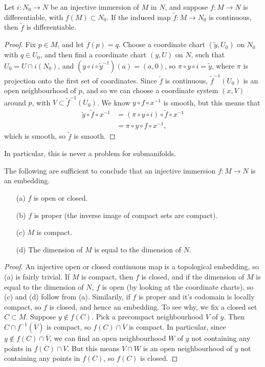 \begin{theorem}
    Let $i: N_0 \to N$ be an injective immersion of $M$ in $N$, and suppose $f: M \to N$ is differentiable, with $f(M) \subset N_0$. If the induced map $\tilde{f}: M \to N_0$ is continuous, then $\tilde{f}$ is differentiable.
\end{theorem}
\begin{proof}
    Fix $p \in M$, and let $f(p) = q$. Choose a coordinate chart $(\tilde{y},U_0)$ on $N_0$ with $q \in U_0$, and then find a coordinate chart $(y,U)$ on $N$, such that $U_0 = U \cap i(N_0)$, and $(y \circ i \circ \tilde{y}^{-1})(a) = (a,0)$, so $\pi \circ y \circ i = \tilde{y}$, where $\pi$ is projection onto the first set of coordinates. Since $\tilde{f}$ is continuous, $\tilde{f}^{-1}(U_0)$ is an open neighbourhood of $p$, and so we can choose a coordinate system $(x,V)$ around $p$, with $V \subset \tilde{f}^{-1}(U_0)$. We know $y \circ f \circ x^{-1}$ is smooth, but this means that
    \begin{align*}
        \tilde{y} \circ \tilde{f} \circ x^{-1} &= ( \pi \circ y \circ i) \circ \tilde{f} \circ x^{-1}\\
        &= \pi \circ y \circ f \circ x^{-1},
    \end{align*}
    which is smooth, so $\tilde{f}$ is smooth.
\end{proof}

In particular, this is never a problem for submanifolds.

\begin{theorem}
    The following are sufficient to conclude that an injective immersion $f: M \to N$ is an embedding.
    \begin{enumerate}
        \item[(a)] $f$ is open or closed.
        \item[(b)] $f$ is proper (the inverse image of compact sets are compact).
        \item[(c)] $M$ is compact.
        \item[(d)] The dimension of $M$ is equal to the dimension of $N$.
    \end{enumerate}
\end{theorem}
\begin{proof}
    An injective open or closed continuous map is a topological embedding, so (a) is fairly trivial. If $M$ is compact, then $f$ is closed, and if the dimension of $M$ is equal to the dimension of $N$, $f$ is open (by looking at the coordinate charts), so (c) and (d) follow from (a). Similarily, if $f$ is proper and it's codomain is locally compact, so $f$ is closed, and hence an embedding. To see why, we fix a closed set $C \subset M$. Suppose $y \not \in f(C)$. Pick a precompact neighbourhood $V$ of $y$. Then $C \cap f^{-1}(\overline{V})$ is compact, so $f(C) \cap \overline{V}$ is compact. In particular, since $y \not \in f(C) \cap \overline{V}$, we can find an open neighbourhood $W$ of $y$ not containing any points in $f(C) \cap V$. But this means $V \cap W$ is an open neighbourhood of $y$ not containing any points in $f(C)$, so $f(C)$ is closed.
\end{proof}

